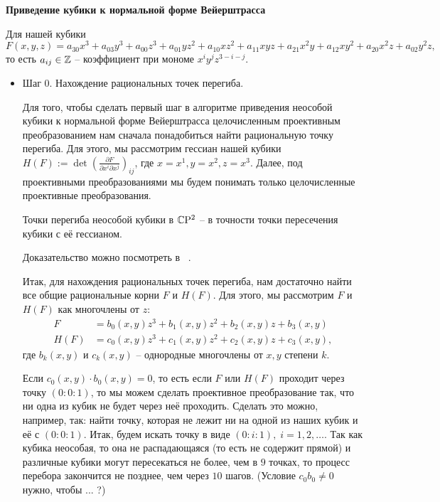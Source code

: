 \begin{center}
    {\normalfont\fontsize{13}{13}\textbf{Приведение кубики к нормальной форме Вейерштрасса}}
\end{center}

Для нашей кубики 
\[
F(x, y, z) = a_{30} x^3 + a_{03} y^3 + a_{00} z^3 + a_{01} y z^2 + a_{10} x z^2 +
a_{11} x y z + a_{21} x^2 y + a_{12} x y^2 + a_{20} x^2 z + a_{02} y^2 z
,\] 
то есть \(a_{ij} \in \mathbb{Z}\) -- коэффициент при мономе \(x^{i} y^{j} z^{3 - i -
j}\). 



\begin{itemize}[leftmargin=0.6cm]
    
    \item Шаг 0. Нахождение рациональных точек перегиба. 

    Для того, чтобы сделать первый шаг в алгоритме приведения неособой
    кубики к нормальной форме Вейерштрасса целочисленным проективным
    преобразованием нам сначала понадобиться найти рациональную точку
    перегиба. Для этого, мы рассмотрим гессиан нашей кубики \(H(F) := \det \left(
    \frac{\partial F}{\partial x^{i} \partial x^{j}}\right)_{ij}\), где \(x =
    x^{1}, y = x^{2}, z = x^{3}\). Далее, под проективными
    преобразованиями мы будем понимать только целочисленные проективные
    преобразования.

    \begin{theoremf}
        Точки перегиба неособой кубики в \(\mathbb{C} \mathrm{P}^2\) -- в точности
        точки пересечения кубики с её гессианом.
    \end{theoremf}

    Доказательство можно посмотреть в ~\cite{pra_sol}.

    Итак, для нахождения рациональных точек перегиба, нам достаточно найти
    все общие рациональные корни \(F\) и \(H(F)\). Для этого, мы
    рассмотрим \(F\) и \(H(F)\) как многочлены от \(z\):
    \begin{align*}
        F &= b_0(x, y) z^3 + b_1(x, y) z^2 + b_2(x, y) z + b_3(x, y) \\
        H(F) &= c_0(x, y) z^3 + c_1(x, y) z^2 + c_2(x, y) z + c_3(x, y) 
    ,\end{align*}
    где \(b_k(x, y)\) и \(c_k(x, y)\) -- однородные многочлены от \(x, y\) 
    степени \(k\). 

    Если \(c_0(x, y) \cdot b_0(x, y) = 0\), то есть если
    \(F\) или \(H(F)\) проходит через точку \((0 : 0 : 1)\), то мы можем
    сделать проективное преобразование так, что ни одна из кубик не будет
    через неё проходить. Сделать это можно, например, так: найти точку,
    которая не лежит ни на одной из наших кубик и  её
    с \((0 : 0 : 1)\). Итак, будем искать точку в виде \((0 : i : 1), \; i
    = 1, 2, \ldots\).
    Так как кубика неособая, то она не распадающаяся (то есть не содержит
    прямой) и различные кубики могут пересекаться не более, чем в \(9\) 
    точках, то процесс перебора закончится не позднее, чем через \(10\) 
    шагов. (Условие \(c_0 b_0 \ne 0\) нужно, чтобы ... ?)


\end{itemize}
